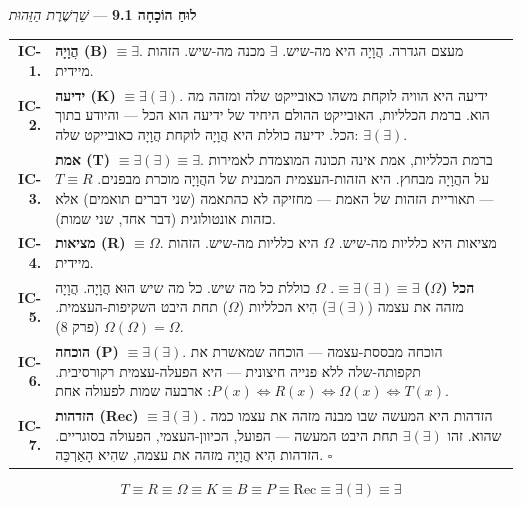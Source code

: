 \documentclass[10pt, openany, oneside]{book}
\renewcommand{\footnotesize}{\fontsize{8.5}{11}\selectfont}
\begin{document}
\vspace{1em}

\textbf{לוּחַ הוֹכָחָה 9.1} --- \textit{שַׁרְשֶׁרֶת הַזֵּהוּת}

\vspace{0.5em}

{\footnotesize
\noindent\begin{tabular}{r p{}}
\textbf{IC-1.} & \textbf{הֲוָיָה (B)} $\equiv \exists$. מעצם הגדרה. הֲוָיָה היא מה-שיש. $\exists$ מכנה מה-שיש. הזהות מיידית. \\[0.5em]
\textbf{IC-2.} & \textbf{ידיעה (K)} $\equiv \exists(\exists)$. ידיעה היא הוויה לוקחת משהו כאובייקט שלה ומזהה מה הוא. ברמת הכלליות, האובייקט ההולם היחיד של ידיעה הוא הכל — והיודע בתוך הכל. ידיעה כוללת היא הֲוָיָה לוקחת הֲוָיָה כאובייקט שלה: $\exists(\exists)$. \\[0.5em]
\textbf{IC-3.} & \textbf{אמת (T)} $\equiv \exists(\exists) \equiv \exists$. ברמת הכלליות, אמת אינה תכונה המוצמדת לאמירות על ההֲוָיָה מבחוץ. היא הזהות-העצמית המבנית של ההֲוָיָה מוכרת מבפנים. $T \equiv R$ — תאוריית הזהות של האמת — מחזיקה לא כהתאמה (שני דברים תואמים) אלא כזהות אונטולוגית (דבר אחד, שני שמות). \\[0.5em]
\textbf{IC-4.} & \textbf{מציאות (R)} $\equiv \Omega$. מציאות היא כלליות מה-שיש. $\Omega$ היא כלליות מה-שיש. הזהות מיידית. \\[0.5em]
\textbf{IC-5.} & \textbf{הכל ($\Omega$)} $\equiv \exists(\exists) \equiv \exists$. $\Omega$ כוללת כל מה שיש. כל מה שיש הוּא הֲוָיָה. הֲוָיָה מזהה את עצמה ($\exists(\exists)$) הִיא הכלליות ($\Omega$) תחת היבט השקיפות-העצמית. $\Omega(\Omega) = \Omega$ (פרק 8). \\[0.5em]
\textbf{IC-6.} & \textbf{הוכחה (P)} $\equiv \exists(\exists)$. הוכחה מבססת-עצמה — הוכחה שמאשרת את תקפותה-שלה ללא פנייה חיצונית — היא הפעלה-עצמית רקורסיבית. $P(x) \iff R(x) \iff \Omega(x) \iff T(x)$: ארבעה שמות לפעולה אחת. \\[0.5em]
\textbf{IC-7.} & \textbf{הזדהות (Rec)} $\equiv \exists(\exists)$. הזדהות היא המעשה שבו מבנה מזהה את עצמו כמה שהוא. זהו $\exists(\exists)$ תחת היבט המעשה — הפועל, הכיוון-העצמי, הפעולה בסוגריים. הזדהות הִיא הֲוָיָה מזהה את עצמה, שהִיא הָאַרְכֵּה. $\square$ \\[0.5em]
\end{tabular}
}

\vspace{0.8em}

$$T \equiv R \equiv \Omega \equiv K \equiv B \equiv P \equiv \text{Rec} \equiv \exists(\exists) \equiv \exists$$
\end{document}
